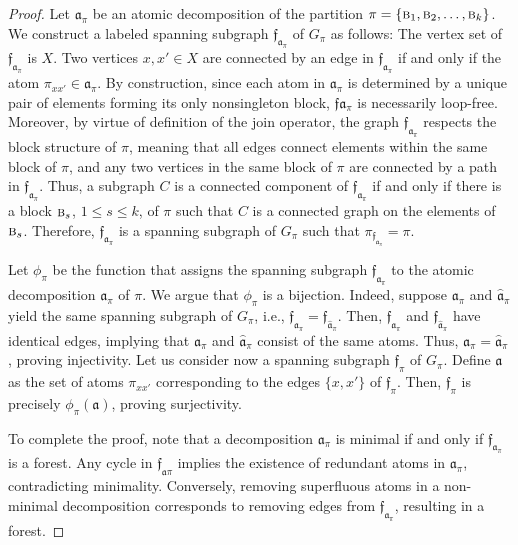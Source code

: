 \documentclass[12pt]{extarticle}
\begin{document}
	\begin{proof}	
		Let $\mathfrak{a}_{\pi}$ be an atomic decomposition of the partition $\pi = \{\textsc{b}_1, \textsc{b}_2, \ldots, \textsc{b}_k\}$. We construct a labeled spanning subgraph $\mathfrak{f}_{\mathfrak{a}_{\pi}}$ of $G_{\pi}$ as follows:
		The vertex set of $\mathfrak{f}_{\mathfrak{a}_{\pi}}$ is $X$. Two vertices $x, x' \in X$ are connected by an edge in $\mathfrak{f}_{\mathfrak{a}_{\pi}}$ if and only if the atom $\pi_{xx'} \in \mathfrak{a}_{\pi}$. By construction, since each atom in $\mathfrak{a}_{\pi}$ is determined by a unique pair of elements forming its only nonsingleton block, $\mathfrak{f}{\mathfrak{a}_{\pi}}$ is necessarily loop-free. Moreover, by virtue of definition of the join operator, the graph $\mathfrak{f}_{\mathfrak{a}_{\pi}}$ respects the block structure of $\pi$, meaning that all edges connect elements within the same block of $\pi$, and any two vertices in the same block of $\pi$ are connected by a path in $\mathfrak{f}_{\mathfrak{a}_{\pi}}$. Thus, a subgraph $C$ is a connected component of $\mathfrak{f}_{\mathfrak{a}_{\pi}}$ if and only if  there is a block $\textsc{b}_s$, $1\leq s\leq k$, of $\pi$ such that $C$ is a connected graph on the elements of $\textsc{b}_s$. Therefore, $\mathfrak{f}_{\mathfrak{a}_{\pi}}$ is a spanning subgraph of $G_{\pi}$ such that $\pi_{\mathfrak{f}_{\mathfrak{a}_{\pi}}}=\pi$.
		
		Let $\phi_{\pi}$ be the function that assigns the spanning subgraph $\mathfrak{f}_{\mathfrak{a}_{\pi}}$ to the atomic decomposition $\mathfrak{a}_{\pi}$ of $\pi$. We argue that $\phi_{\pi}$ is a bijection. Indeed, suppose $\mathfrak{a}_{\pi}$ and $\mathfrak{\widehat{a}}_{\pi}$ yield the same spanning subgraph of $G_{\pi}$, i.e., $\mathfrak{f}_{\mathfrak{a}_{\pi}}=\mathfrak{f}_{\mathfrak{\widehat{a}}_{\pi}}$. Then, $\mathfrak{f}_{\mathfrak{a}_{\pi}}$ and $\mathfrak{f}_{\mathfrak{\widehat{a}}_{\pi}}$ have identical edges, implying that $\mathfrak{a}_{\pi}$ and $\mathfrak{\widehat{a}}_{\pi}$ consist of the same atoms. Thus, $\mathfrak{a}_{\pi} = \mathfrak{\widehat{a}}_{\pi}$, proving injectivity. Let us consider now a spanning subgraph $\mathfrak{f}_{\pi}$ of $G_{\pi}$. Define $\mathfrak{a}$ as the set of atoms $\pi_{xx'}$ corresponding to the edges $\{x,x'\}$ of $\mathfrak{f}_{\pi}$. Then, $\mathfrak{f}_{\pi}$ is precisely $\phi_{\pi}(\mathfrak{a})$, proving surjectivity.
		
		To complete the proof, note that a decomposition $\mathfrak{a}_{\pi}$ is minimal if and only if $\mathfrak{f}_{\mathfrak{a}_{\pi}}$ is a forest. Any cycle in $\mathfrak{f}_{\mathfrak{a}{\pi}}$ implies the existence of redundant atoms in $\mathfrak{a}_{\pi}$, contradicting minimality. Conversely, removing superfluous atoms in a non-minimal decomposition corresponds to removing edges from $\mathfrak{f}_{\mathfrak{a}_{\pi}}$, resulting in a forest. 
	\end{proof}
	
\end{document}
